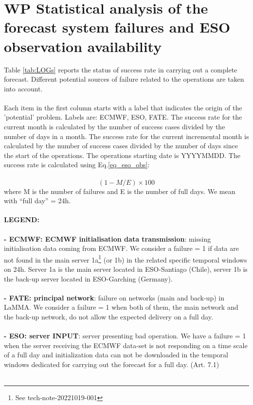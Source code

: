 \section{WP Statistical analysis of the forecast system failures and ESO observation availability}
\label{sect:2}

Table \ref{tab:LOGs} reports the status of success rate in carrying out a complete forecast. Different potential sources of failure related to the operations are taken into account. \\ \\
\noindent
Each item in the first column starts with a label that indicates the origin of the 'potential' problem. Labels are: ECMWF, ESO, FATE. The success rate for the current month is calculated by the number of success cases divided by the number of days in a month. The success rate for the current incremental month is calculated by the number of success cases divided by the number of days since the start of the operations.
The operations starting date is YYYYMMDD. The success rate is calculated using Eq.\ref{eq_eso_obs}:\\  \\
\begin{equation}
(1-M/E)\times 100
\label{eq_eso_obs}
\end{equation}
where M is the number of failures and E is the number of full days. We mean with ``full day'' = 24h.\\ \\ 
\noindent
{\bf LEGEND:}\\ \\
\noindent
{\bf - ECMWF: ECMWF initialisation data transmission}: missing initialisation data coming from ECMWF.  We consider a failure = 1 if data are not found in the main server 1a\footnote{See tech-note-20221019-001} (or 1b) in the related specific temporal windows on 24h. Server 1a is the main server located in ESO-Santiago (Chile), server 1b is the back-up server located in ESO-Garching (Germany). \\ \\
\noindent
{\bf - FATE:  principal network}:  failure on networks (main and back-up) in LaMMA. We consider a failure = 1 when both of them, the main network and the back-up network, do not allow the expected delivery on a full day. \\ \\
\noindent
{\bf - ESO:  server INPUT}: server presenting bad operation. We have a failure = 1 when the server receiving the ECMWF data-set is not responding on a time scale of a full day and initialization data can not be downloaded in the temporal windows dedicated for carrying out the forecast for a full day. (Art. 7.1) \\ \\ 

